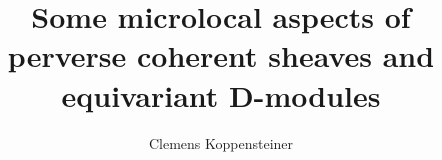 \documentclass[english]{thesis}
\title{Some microlocal aspects of perverse coherent sheaves and equivariant D-modules}
\author{Clemens Koppensteiner}
\begin{document}
\frontmatter

\maketitlepage

\begin{abstract}
\end{abstract}



\tableofcontents

\mainmatter





\backmatter

\printbibliography
\end{document}

